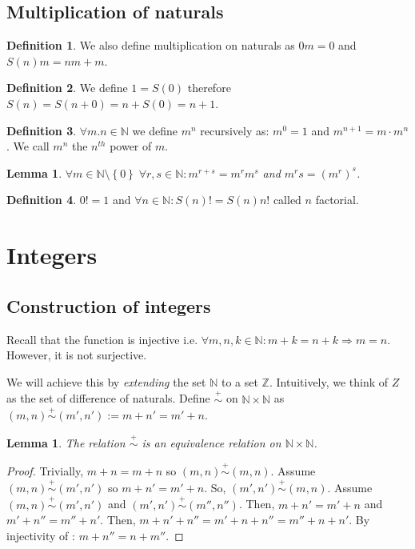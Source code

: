 \documentclass{article}
\newcommand\N{\ensuremath{\mathbb{N}}}
\newcommand\Z{\ensuremath{\mathbb{Z}}}
\newcommand\pr{\stackrel{+}{\sim}}
\newtheorem{lemma}[theorem]{Lemma}
\theoremstyle{definition}
\newtheorem{definition}{Definition}[subsection]
\theoremstyle{remark}
\theoremstyle{plain}
\begin{document}
\subsection{Multiplication of naturals}

\begin{definition}
    We also define multiplication on naturals as \(0 m = 0 \) and \(S(n)m = nm + m\).
\end{definition}

\begin{definition}
    We define \(1 = S(0)\) therefore \(S(n) = S(n+0) = n + S(0) = n+1\).
\end{definition}

\begin{definition}
    \(\forall m.n \in \N\) we define \(m^n\) recursively as: \(m^0 = 1\) and \(m^{n+1} = m\cdot m^n\).
    We call \(m^n\) the \(n^{th}\) power of \(m\).
\end{definition}

\begin{lemma}
    \(\forall m \in \N\setminus \left\{ 0 \right\} \; \forall r,s \in \N: m^{r+s} = m^rm^s\) and \(m^rs = (m^r)^s\).
\end{lemma}
\begin{definition}
    \(0! = 1\) and \(\forall n \in \N: S(n)! = S(n)n!\) called \(n\) factorial. 
\end{definition}

\section{Integers}
\subsection{Construction of integers}
Recall that the function  is injective i.e. \(\forall m,n,k \in \N: m+k = n + k \Rightarrow m=n\). 
However, it is not surjective. 

We will achieve this by \emph{extending} the set \(\N\) to a set \(\Z\). Intuitively, we think of \(Z\) as the set of difference of 
naturals. Define \(\pr\) on \(\N \times \N\) as \((m,n) \pr (m', n') := m + n' = m' +n\).

\begin{lemma}
    The relation \(\pr\) is an equivalence relation on \(\N\times \N\).
\end{lemma}
\begin{proof}
    Trivially, \(m+n = m + n\) so \((m,n)\pr (m,n)\). Assume \((m,n) \pr (m',n')\) so
    \(m + n' = m' + n\). So, \((m',n')\pr (m,n)\). Assume \((m,n)\pr (m', n')\) and \((m',n') \pr (m'', n'')\). Then, \(m + n' = m' + n\) and \(m' + n'' = m'' + n'\).
    Then, \(m + n' + n'' = m' + n + n'' = m'' + n + n'\). By injectivity of : \(m + n'' = n + m''\).
\end{proof}
\end{document}
